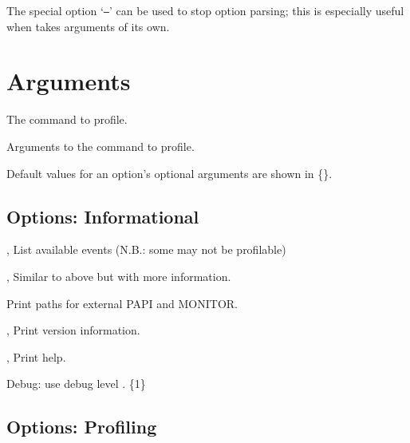 \documentclass[english]{article}
\begin{document}
The special option `\texttt{--}' can be used to stop  option parsing; this is especially useful when  takes arguments of its own.


\section{Arguments}

\begin{Description}
\item[\Arg{command}] The command to profile.
\item[\Arg{command-arguments}] Arguments to the command to profile.
\end{Description}

Default values for an option's optional arguments are shown in \{\}.

\subsection{Options: Informational}

\begin{Description}
\item[\Opt{-l}, \Opt{--events-short}] List available events (N.B.: some may not be profilable)
\item[\Opt{-L}, \Opt{--events-long}] Similar to above but with more information.
\item[\Opt{--paths}] Print paths for external PAPI and MONITOR.
\item[\Opt{-V}, \Opt{--version}] Print version information.
\item[\Opt{-h}, \Opt{--help}] Print help.
\item[\OptoArg{--debug}{n}]   Debug: use debug level . \{1\}
\end{Description}

\subsection{Options: Profiling}
\end{document}

